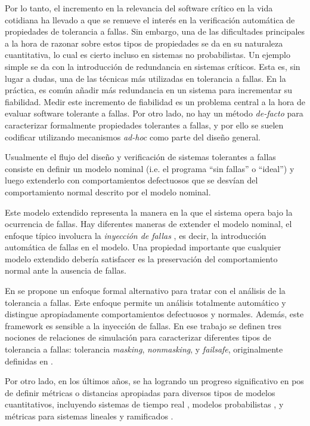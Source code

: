 Por lo tanto, el incremento en la relevancia del software crítico en la vida cotidiana ha llevado a que se renueve el interés en la verificación automática de propiedades de tolerancia a fallas. Sin embargo, una de las dificultades principales a la hora de razonar sobre estos tipos de propiedades se da en su naturaleza cuantitativa, lo cual es cierto incluso en sistemas no probabilistas.
Un ejemplo simple se da con la introducción de redundancia en sistemas críticos. Esta es, sin lugar a dudas, una de las técnicas más utilizadas en tolerancia a fallas.
En la práctica, es común añadir más redundancia en un sistema para incrementar su fiabilidad. Medir este incremento de fiabilidad es un problema central a la hora de evaluar software tolerante a fallas. Por otro lado, no hay un método \emph{de-facto} para caracterizar formalmente propiedades tolerantes a fallas, y por ello se suelen codificar utilizando mecanismos \emph{ad-hoc} como parte del diseño general.

Usualmente el flujo del diseño y verificación de sistemas tolerantes a fallas consiste en definir un modelo nominal (i.e. el programa ``sin fallas'' o ``ideal'') y luego extenderlo con comportamientos defectuosos que se desvían del comportamiento normal descrito por el modelo nominal.

Este modelo extendido representa la manera en la que el sistema opera bajo la ocurrencia de fallas.
Hay diferentes maneras de extender el modelo nominal, el enfoque típico involucra la \emph{inyección de fallas}  \cite{HsuehTI97,IyerNGK10}, es decir, la introducción automática de fallas en el modelo. Una propiedad importante que cualquier modelo extendido debería satisfacer es la preservación del comportamiento normal ante la ausencia de fallas.

En \cite{DemasiCMA17} se propone un enfoque formal alternativo para tratar con el análisis de la tolerancia a fallas. Este enfoque permite un análisis totalmente automático y distingue apropiadamente comportamientos defectuosos y normales. Además, este framework es sensible a la inyección de fallas. En ese trabajo se definen tres nociones de relaciones de simulación para caracterizar diferentes tipos de tolerancia a fallas:
tolerancia \emph{masking}, \emph{nonmasking}, y \emph{failsafe}, originalmente definidas en \cite{Gartner99}. 

Por otro lado, en los últimos años, se ha logrando un progreso significativo en pos de definir métricas o distancias apropiadas para diversos tipos de modelos cuantitativos, incluyendo sistemas de tiempo real \cite{HenzingerMP05}, modelos probabilistas \cite{DesharnaisGJP04}, y métricas para sistemas lineales y ramificados \cite{CernyHR12,AlfaroFS09,Henzinger13,LarsenFT11,ThraneFL10}. 

